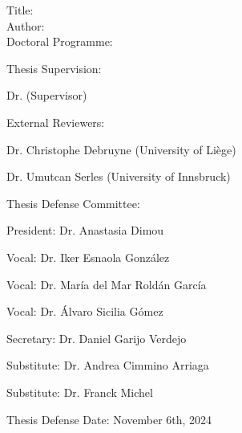
\begin{spacing}{1.3}
Title: \thesisTitle \\
Author: \thesisAuthor \\
Doctoral Programme:	 \DoctoralProgramme
\end{spacing}
Thesis Supervision: 
\begin{mydescription}
    \item Dr. \supervisorDetails  (Supervisor)
\end{mydescription}

\vspace{10 mm}
External Reviewers: 
\begin{mydescription}
    \item Dr. Christophe Debruyne (University of Liège)
    \item Dr. Umutcan Serles (University of Innsbruck)
\end{mydescription}

\vspace{10 mm}

Thesis Defense Committee: %
\begin{mydescription}
    \item President:\hspace{1.7mm} Dr. Anastasia Dimou
    \item Vocal:\hspace{8.7mm} Dr. Iker Esnaola González
    \item Vocal:\hspace{8.7mm}  Dr. María del Mar Roldán García
    \item Vocal:\hspace{8.7mm}  Dr. Álvaro Sicilia Gómez
    \item Secretary:\hspace{1.5mm} Dr. Daniel Garijo Verdejo
    \item Substitute: Dr. Andrea Cimmino Arriaga
    \item Substitute: Dr. Franck Michel
\end{mydescription}


\vspace{10mm}


Thesis Defense Date: November 6th, 2024



\vspace{\fill}

